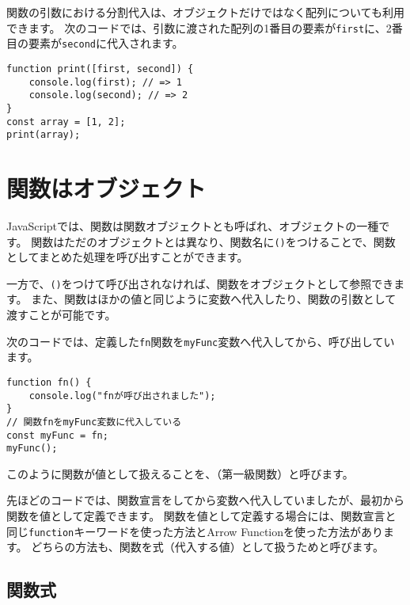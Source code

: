 関数の引数における分割代入は、オブジェクトだけではなく配列についても利用できます。
次のコードでは、引数に渡された配列の1番目の要素が\texttt{first}に、2番目の要素が\texttt{second}に代入されます。

\begin{lstlisting}
function print([first, second]) {
    console.log(first); // => 1
    console.log(second); // => 2
}
const array = [1, 2];
print(array);
\end{lstlisting}

\hypertarget{first-class-function}{%
\section{関数はオブジェクト}\label{first-class-function}}

JavaScriptでは、関数は関数オブジェクトとも呼ばれ、オブジェクトの一種です。
関数はただのオブジェクトとは異なり、関数名に\texttt{()}をつけることで、関数としてまとめた処理を呼び出すことができます。

一方で、\texttt{()}をつけて呼び出されなければ、関数をオブジェクトとして参照できます。
また、関数はほかの値と同じように変数へ代入したり、関数の引数として渡すことが可能です。

次のコードでは、定義した\texttt{fn}関数を\texttt{myFunc}変数へ代入してから、呼び出しています。

\begin{lstlisting}
function fn() {
    console.log("fnが呼び出されました");
}
// 関数fnをmyFunc変数に代入している
const myFunc = fn;
myFunc();
\end{lstlisting}

このように関数が値として扱えることを、\textbf{}（第一級関数）と呼びます。

先ほどのコードでは、関数宣言をしてから変数へ代入していましたが、最初から関数を値として定義できます。
関数を値として定義する場合には、関数宣言と同じ\texttt{function}キーワードを使った方法とArrow
Functionを使った方法があります。
どちらの方法も、関数を式（代入する値）として扱うため\textbf{}と呼びます。

\hypertarget{function-expression}{%
\subsection{関数式}\label{function-expression}}

